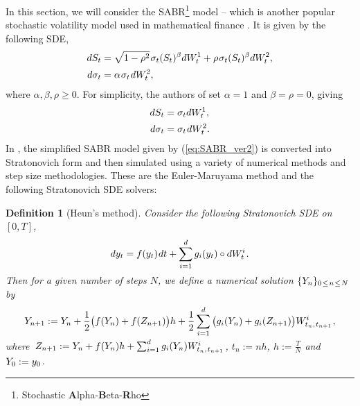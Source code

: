 \documentclass[sn-mathphys-num]{sn-jnl}%
\newtheorem{definition}{Definition}%
\newcommand{\m}{\hspace{0.25mm}}
\begin{document}
In this section, we will consider the SABR\footnote{Stochastic \textbf{A}lpha-\textbf{B}eta-\textbf{R}ho} model -- which is another popular stochastic volatility model used in mathematical finance \cite{hagan2002SABR, cai2017SABR, leitao2017SABR, cui2018SABR}. It is given by the following SDE,
\begin{align}\label{eq:SABR}
dS_t & = \sqrt{1-\rho^2}\m \sigma_t (S_t)^\beta  dW_t^1 + \rho\m \sigma_t (S_t)^\beta  dW_t^2,\\[1pt]
d\sigma_t & = \alpha\m\sigma_t\m dW_t^2,\nonumber
\end{align}
where $\alpha,\beta,\rho \geq 0$.
For simplicity, the authors of \cite{foster2024adaptive} set $\alpha = 1$ and $\beta = \rho = 0$, giving
\begin{align}
dS_t & = \sigma_t dW_t^1,\label{eq:SABR_ver2}\\[1pt]
d\sigma_t & = \sigma_t\m dW_t^2.\nonumber
\end{align}
In \cite{foster2024adaptive}, the simplified SABR model given by (\ref{eq:SABR_ver2}) is converted into Stratonovich form and then simulated using a variety of numerical methods and step size methodologies.
These are the Euler-Maruyama method and the following Stratonovich SDE solvers:\medbreak
\begin{definition}[Heun's method]
Consider the following Stratonovich SDE on $[0,T]$,\vspace{-2mm}
\begin{align}\label{eq:strat_sde}
dy_t = f(y_t)\m dt + \sum_{i=1}^d g_i(y_t) \circ dW_t^i\m.\\[-18pt]\nonumber
\end{align}
Then for a given number of steps $N$, we define a numerical solution $\{Y_n\}_{0\m\leq\m n\m\leq\m N}$ by\vspace{-2mm}
\begin{align*}
Y_{n+1} := Y_n + \frac{1}{2}\big(f(Y_n)+f(Z_{n+1})\big)h + \frac{1}{2}\sum_{i=1}^d \big(g_i(Y_n) + g_i(Z_{n+1})\big) W_{t_n,\m t_{n+1}}^i\m,\\[-20pt]\nonumber
\end{align*}
where $\,Z_{n+1} := Y_n + f(Y_n)h + \sum_{i=1}^d g_i(Y_n)  W_{t_n,\m t_{n+1}}^i\m$, $t_n := nh$, $h := \frac{T}{N}$ and $Y_0 := y_0\m$.
\end{definition}\vspace*{3mm}
\end{document}
